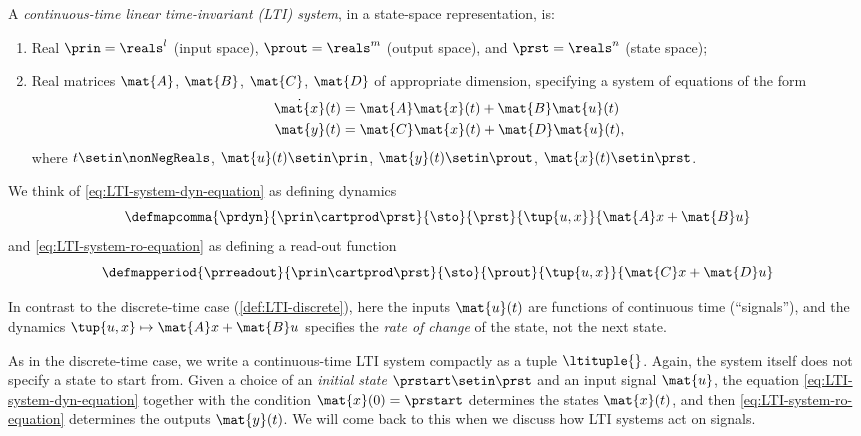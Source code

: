 \begin{definition}
    \label{def:LTI_syst_first_time}
    A \emph{continuous-time linear time-invariant (LTI) system}, in a state-space representation, is:

    \constit
    \begin{enumerate}
        \item Real  $\prin=\reals^l$ (input space), $\prout=\reals^m$ (output space), and $\prst=\reals^n$ (state space);
        \item Real matrices $\mat{A}$, $\mat{B}$, $\mat{C}$, $\mat{D}$ of appropriate dimension, specifying a system of equations of the form
              \begin{align}
                  \dot{\mat{x}}(t) & = \mat{A}\mat{x}(t) + \mat{B}\mat{u}(t) \label{eq:LTI-system-dyn-equation} \\
                  \mat{y}(t)       & = \mat{C}\mat{x}(t) + \mat{D}\mat{u}(t) \label{eq:LTI-system-ro-equation},
              \end{align}
              where $t \setin \nonNegReals$, $\mat{u}(t) \setin \prin$, $\mat{y}(t) \setin \prout$, $\mat{x}(t) \setin \prst$.
    \end{enumerate}
\end{definition}

We think of \cref{eq:LTI-system-dyn-equation} as defining dynamics
\begin{equation}
    \defmapcomma{
        \prdyn
    }{ \prin \cartprod  \prst
    }{ \sto
    }{  \prst
    }{ \tup{u, x}
    }{ \mat{A}x + \mat{B}u
    }
\end{equation}
and \cref{eq:LTI-system-ro-equation} as defining a read-out function
\begin{equation}
    \defmapperiod{
        \prreadout
    }{ \prin \cartprod  \prst
    }{ \sto
    }{  \prout
    }{ \tup{u, x}
    }{ \mat{C}x + \mat{D}u
    }
\end{equation}

In contrast to the discrete-time case (\cref{def:LTI-discrete}), here the inputs $\mat{u}(t)$ are functions of continuous time (``signals''), and the dynamics $\tup{u, x} \mapsto \mat{A}x + \mat{B}u$ specifies the \emph{rate of change} of the state, not the next state.

As in the discrete-time case, we write a continuous-time LTI system compactly as a tuple $\ltituple{}$.
Again, the system itself does not specify a state to start from.
Given a choice of an \emph{initial state} $\prstart \setin \prst$ and an input signal $\mat{u}$, the equation \cref{eq:LTI-system-dyn-equation} together with the condition $\mat{x}(0) = \prstart$ determines the states $\mat{x}(t)$, and then \cref{eq:LTI-system-ro-equation} determines the outputs $\mat{y}(t)$.
We will come back to this when we discuss how LTI systems act on signals.

